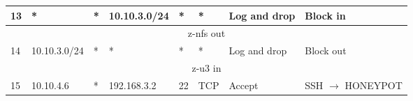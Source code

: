 \documentclass[a4paper, 11pt, oneside]{article}
\begin{document}
\begin{table}[H]
{\begin{tabular}{|llllllll|}
\multicolumn{1}{|l|}{13}          & \multicolumn{1}{l|}{*}                                                            & \multicolumn{1}{l|}{*}                                                              & \multicolumn{1}{l|}{10.10.3.0/24}                                                      & \multicolumn{1}{l|}{*}                                                                   & \multicolumn{1}{l|}{*}                 & \multicolumn{1}{l|}{Log and drop}    & Block in                               \\ \hline
\multicolumn{8}{|c|}{{\color[HTML]{FE0000} z-nfs out}}                                                                                                                                                                                                                                                                                                                                                                                                                                                                   \\ \hline
\multicolumn{1}{|l|}{14}          & \multicolumn{1}{l|}{10.10.3.0/24}                                                 & \multicolumn{1}{l|}{*}                                                              & \multicolumn{1}{l|}{*}                                                                 & \multicolumn{1}{l|}{*}                                                                   & \multicolumn{1}{l|}{*}                 & \multicolumn{1}{l|}{Log and drop}    & Block out                              \\ \hline
\multicolumn{8}{|c|}{{\color[HTML]{FE0000} z-u3 in}}                                                                                                                                                                                                                                                                                                                                                                                                                                                                     \\ \hline
\multicolumn{1}{|l|}{15}          & \multicolumn{1}{l|}{10.10.4.6}                                                    & \multicolumn{1}{l|}{*}                                                              & \multicolumn{1}{l|}{192.168.3.2}                                                       & \multicolumn{1}{l|}{22}                                                                  & \multicolumn{1}{l|}{TCP}               & \multicolumn{1}{l|}{Accept}          & SSH $\rightarrow$ HONEYPOT             \\ \hline

\end{tabular}}
\end{table}
\end{document}
